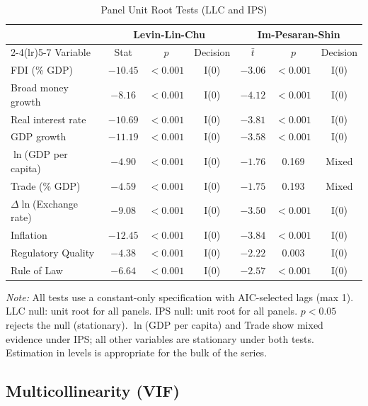 \begin{table}[htbp]
\centering
\setlength{\tabcolsep}{4pt}
\renewcommand{\arraystretch}{0.95}
\caption{Panel Unit Root Tests (LLC and IPS)}
\label{tab:unit-root}
\begin{tabular}{lcccccc}
\hline\hline
 & \multicolumn{3}{c}{Levin-Lin-Chu} & \multicolumn{3}{c}{Im-Pesaran-Shin} \\
\cmidrule(lr){2-4}\cmidrule(lr){5-7}
Variable & Stat & $p$ & Decision & $\bar{t}$ & $p$ & Decision \\
\hline
FDI (\% GDP)              & $-10.45$ & $<0.001$ & I(0) & $-3.06$ & $<0.001$ & I(0) \\
Broad money growth        & $-8.16$  & $<0.001$ & I(0) & $-4.12$ & $<0.001$ & I(0) \\
Real interest rate        & $-10.69$ & $<0.001$ & I(0) & $-3.81$ & $<0.001$ & I(0) \\
GDP growth                & $-11.19$ & $<0.001$ & I(0) & $-3.58$ & $<0.001$ & I(0) \\
$\ln$(GDP per capita)     & $-4.90$  & $<0.001$ & I(0) & $-1.76$ & 0.169   & Mixed \\
Trade (\% GDP)            & $-4.59$  & $<0.001$ & I(0) & $-1.75$ & 0.193   & Mixed \\
$\Delta\ln$(Exchange rate)& $-9.08$  & $<0.001$ & I(0) & $-3.50$ & $<0.001$ & I(0) \\
Inflation                 & $-12.45$ & $<0.001$ & I(0) & $-3.84$ & $<0.001$ & I(0) \\
Regulatory Quality        & $-4.38$  & $<0.001$ & I(0) & $-2.22$ & 0.003   & I(0) \\
Rule of Law               & $-6.64$  & $<0.001$ & I(0) & $-2.57$ & $<0.001$ & I(0) \\
\hline\hline
\end{tabular}
\par\noindent\textit{Note:} All tests use a constant-only specification with AIC-selected lags (max 1). LLC null: unit root for all panels. IPS null: unit root for all panels. $p < 0.05$ rejects the null (stationary). $\ln$(GDP per capita) and Trade show mixed evidence under IPS; all other variables are stationary under both tests. Estimation in levels is appropriate for the bulk of the series.
\end{table}

\subsection{Multicollinearity (VIF)}
\label{subsec:vif}

